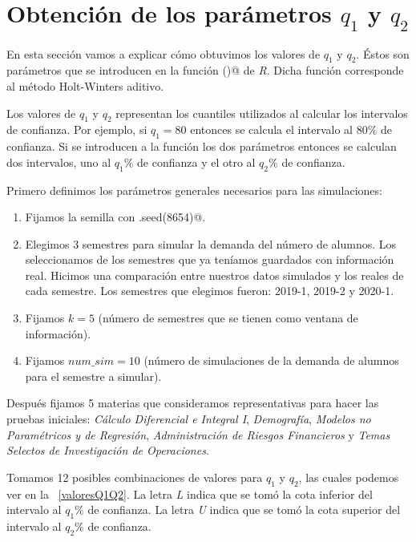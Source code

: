 \section{Obtención de los parámetros $q_{1}$ y $q_{2}$}

En esta sección vamos a explicar cómo obtuvimos los valores de $q_{1}$ y $q_{2}$. Éstos son parámetros que se introducen en la función \verb@hw()@ de \textit{R}. Dicha función corresponde al método Holt-Winters aditivo.

Los valores de $q_{1}$ y $q_{2}$ representan los cuantiles utilizados al calcular los intervalos de confianza. Por ejemplo, si $q_{1} = 80$ entonces se calcula el intervalo al $80\%$ de confianza. Si se introducen a la función los dos parámetros entonces se calculan dos intervalos, uno al $q_{1}\%$ de confianza y el otro al $q_{2}\%$ de confianza.

Primero definimos los parámetros generales necesarios para las simulaciones:
  
  \begin{enumerate}
\item Fijamos la semilla con \verb@set.seed(8654)@.

\item Elegimos 3 semestres para simular la demanda del número de alumnos. Los seleccionamos de los semestres que ya teníamos guardados con información real. Hicimos una comparación entre nuestros datos simulados y los reales de cada semestre. Los semestres que elegimos fueron: 2019-1, 2019-2 y 2020-1.

\item Fijamos $k = 5$ (número de semestres que se tienen como ventana de información).

\item Fijamos $num\_sim = 10$ (número de simulaciones de la demanda de alumnos para el semestre a simular).
\end{enumerate}


Después fijamos 5 materias que consideramos representativas para hacer las pruebas iniciales: \textit{Cálculo Diferencial e Integral I}, \textit{Demografía}, \textit{Modelos no Paramétricos y de Regresión}, \textit{Administración de Riesgos Financieros} y \textit{Temas Selectos de Investigación de Operaciones}.

Tomamos 12 posibles combinaciones de valores para $q_{1}$ y $q_{2}$, las cuales podemos ver en la \tablename{~\ref{valoresQ1Q2}}. La letra \textit{L} indica que se tomó la cota inferior del intervalo al $q_{1}\%$ de confianza. La letra \textit{U} indica que se tomó la cota superior del intervalo al $q_{2}\%$ de confianza.

